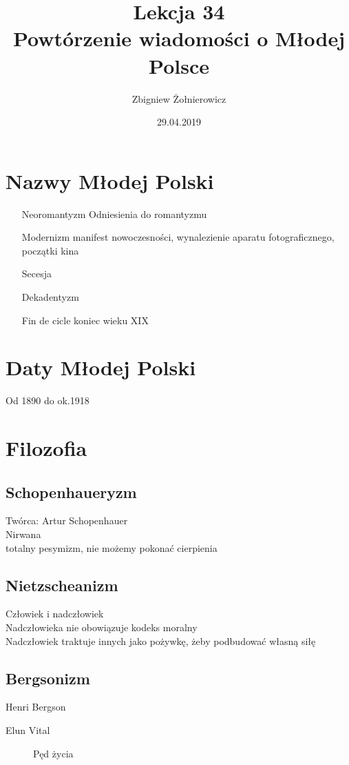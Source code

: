 \documentclass{article}
\begin{document}
\title{
        {\huge Lekcja 34} \\
        {\large Powtórzenie wiadomości o Młodej Polsce}
}
\author{Zbigniew Żołnierowicz}
\date{29.04.2019}
\maketitle
\section{Nazwy Młodej Polski}
\begin{itemize}
    \item[Neoromantyzm] Odniesienia do romantyzmu
    \item[Modernizm] manifest nowoczesności, wynalezienie aparatu fotograficznego, początki kina
    \item[Secesja] 
    \item[Dekadentyzm] 
    \item[Fin de cicle] koniec wieku XIX
\end{itemize}
\section{Daty Młodej Polski}
Od 1890 do ok.\@ 1918
\section{Filozofia}
\subsection{Schopenhaueryzm}
Twórca: Artur Schopenhauer \\
Nirwana \\
totalny pesymizm, nie możemy pokonać cierpienia
\subsection{Nietzscheanizm}
Człowiek i nadczłowiek \\
Nadczłowieka nie obowiązuje kodeks moralny \\
Nadczłowiek traktuje innych jako pożywkę, żeby podbudować własną siłę
\subsection{Bergsonizm}
Henri Bergson

\begin{description}
    \item[Elun Vital] Pęd życia
\end{description}
\end{document}
